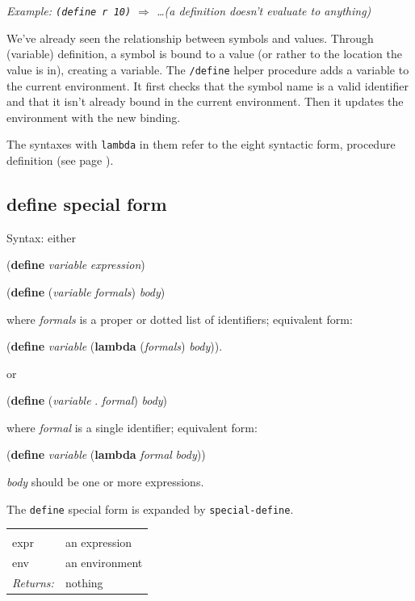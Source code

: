 \documentclass[a5paper,draft]{memoir}
\begin{document}
\emph{Example: \texttt{(define r 10)} $\Rightarrow$ \ldots  (a definition doesn't evaluate to anything)}

We've already seen the relationship between symbols and values. Through (variable) definition, a symbol is bound to a value (or rather to the location the value is in), creating a variable. The \texttt{/define} helper procedure adds a variable to the current environment. It first checks that the symbol name is a valid identifier and that it isn't already bound in the current environment. Then it updates the environment with the new binding.

The syntaxes with \texttt{lambda} in them refer to the eight syntactic form, procedure definition (see page \pageref{procedure-definition}).

\subsection{define special form}
\label{define-special-form}

Syntax: either

(\textbf{define} \emph{variable} \emph{expression})

(\textbf{define} (\emph{variable} \emph{formals}) \emph{body})

where \emph{formals} is a proper or dotted list of identifiers; equivalent form:

(\textbf{define} \emph{variable} (\textbf{lambda} (\emph{formals}) \emph{body})).

or

(\textbf{define} (\emph{variable} . \emph{formal}) \emph{body})

where \emph{formal} is a single identifier; equivalent form:

(\textbf{define} \emph{variable} (\textbf{lambda} \emph{formal} \emph{body}))

\emph{body} should be one or more expressions.

The \texttt{define} special form is expanded by \texttt{special-define}.

\noindent\begin{tabular}{ |p{1.9cm} p{6.5cm}| }
\hline
\rowcolor[HTML]{CCCCCC} \multicolumn{2}{|l|}{\textbf{special-define (internal)}} \\
expr & an expression \\
env & an environment \\
\textit{Returns:} & nothing \\
\hline
\end{tabular}
\end{document}
